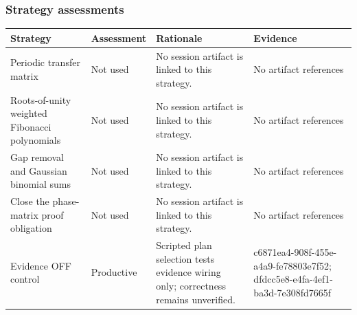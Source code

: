 \documentclass[11pt]{article}
\begin{document}
\subsubsection*{Strategy assessments}
\begin{longtable}{>{\raggedright\arraybackslash}p{.16\linewidth}>{\raggedright\arraybackslash}p{.15\linewidth}>{\raggedright\arraybackslash}p{.40\linewidth}>{\raggedright\arraybackslash}p{.17\linewidth}}
\toprule Strategy & Assessment & Rationale & Evidence \\
\midrule\endhead
Periodic transfer matrix & Not used & No session artifact is linked to this strategy. & No artifact references \\
Roots-of-unity weighted Fibonacci polynomials & Not used & No session artifact is linked to this strategy. & No artifact references \\
Gap removal and Gaussian binomial sums & Not used & No session artifact is linked to this strategy. & No artifact references \\
Close the phase-matrix proof obligation & Not used & No session artifact is linked to this strategy. & No artifact references \\
Evidence OFF control & Productive & Scripted plan selection tests evidence wiring only; correctness remains unverified. & c6871ea4-908f-455e-a4a9-fe78803e7f52; dfdcc5e8-e4fa-4ef1-ba3d-7e308fd7665f \\
\bottomrule
\end{longtable}
\end{document}
